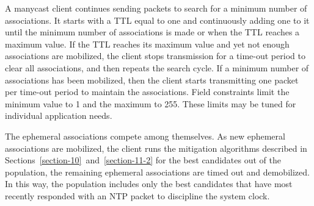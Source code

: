 A manycast client continues sending packets to search for a minimum
number of associations. It starts with a TTL equal to one and
continuously adding one to it until the minimum number of
associations is made or when the TTL reaches a maximum value. If the
TTL reaches its maximum value and yet not enough associations are
mobilized, the client stops transmission for a time-out period to
clear all associations, and then repeats the search cycle. If a
minimum number of associations has been mobilized, then the client
starts transmitting one packet per time-out period to maintain the
associations. Field constraints limit the minimum value to 1 and the
maximum to 255. These limits may be tuned for individual application
needs.

The ephemeral associations compete among themselves. As new
ephemeral associations are mobilized, the client runs the mitigation
algorithms described in Sections~\ref{section-10}~and~\ref{section-11-2} for the best candidates
out of the population, the remaining ephemeral associations are timed
out and demobilized. In this way, the population includes only the
best candidates that have most recently responded with an NTP packet
to discipline the system clock.
